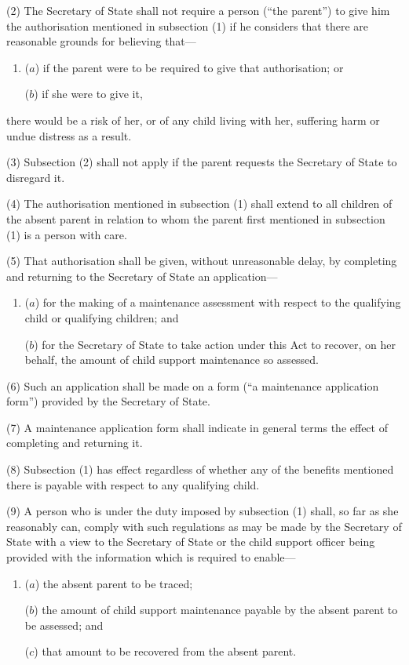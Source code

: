 \documentclass[12pt,a4paper]{article}
\begin{document}
(2) The Secretary of State shall not require a person (“the parent”) to give him the authorisation mentioned in subsection (1)  if he considers that there are reasonable grounds for believing that—
\begin{enumerate}\item[]
($a$) if the parent were to be required to give that authorisation; or

($b$) if she were to give it,
\end{enumerate}
there would be a risk of her, or of any child living with her, suffering harm or undue distress as a result.

(3) Subsection (2)  shall not apply if the parent requests the Secretary of State to disregard it.

(4) The authorisation mentioned in subsection (1)  shall extend to all children of the absent parent in relation to whom the parent first mentioned in subsection (1)  is a person with care.

(5) That authorisation shall be given, without unreasonable delay, by completing and returning to the Secretary of State an application—
\begin{enumerate}\item[]
($a$) for the making of a maintenance assessment with respect to the qualifying child or qualifying children; and

($b$) for the Secretary of State to take action under this Act to recover, on her behalf, the amount of child support maintenance so assessed.
\end{enumerate}

(6) Such an application shall be made on a form (“a maintenance application form”) provided by the Secretary of State.

(7) A maintenance application form shall indicate in general terms the effect of completing and returning it.

(8) Subsection (1)  has effect regardless of whether any of the benefits mentioned there is payable with respect to any qualifying child.

(9) A person who is under the duty imposed by subsection (1)  shall, so far as she reasonably can, comply with such regulations as may be made by the Secretary of State with a view to the Secretary of State 
or the child support officer  %
being provided with the information which is required to enable—
\begin{enumerate}\item[]
($a$) the absent parent to be traced;

($b$) the amount of child support maintenance payable by the absent parent to be assessed; and

($c$) that amount to be recovered from the absent parent.
\end{enumerate}
\end{document}
